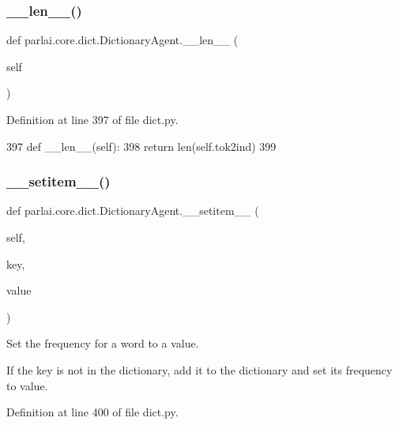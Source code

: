 \subsubsection{\texorpdfstring{\+\_\+\+\_\+len\+\_\+\+\_\+()}{\_\_len\_\_()}}
{\footnotesize\ttfamily def parlai.\+core.\+dict.\+Dictionary\+Agent.\+\_\+\+\_\+len\+\_\+\+\_\+ (\begin{DoxyParamCaption}\item[{}]{self }\end{DoxyParamCaption})}



Definition at line 397 of file dict.\+py.


\begin{DoxyCode}
397     \textcolor{keyword}{def }\_\_len\_\_(self):
398         \textcolor{keywordflow}{return} len(self.tok2ind)
399 
\end{DoxyCode}
\mbox{\label{classparlai_1_1core_1_1dict_1_1DictionaryAgent_a43dfd6220ded966731b62bca37333dec}} 
\subsubsection{\texorpdfstring{\+\_\+\+\_\+setitem\+\_\+\+\_\+()}{\_\_setitem\_\_()}}
{\footnotesize\ttfamily def parlai.\+core.\+dict.\+Dictionary\+Agent.\+\_\+\+\_\+setitem\+\_\+\+\_\+ (\begin{DoxyParamCaption}\item[{}]{self,  }\item[{}]{key,  }\item[{}]{value }\end{DoxyParamCaption})}

\begin{DoxyVerb}Set the frequency for a word to a value.

If the key is not in the dictionary, add it to the dictionary and set its
frequency to value.
\end{DoxyVerb}
 

Definition at line 400 of file dict.\+py.


